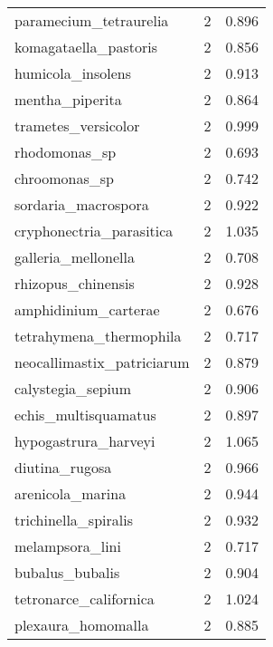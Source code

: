 \begin{tabular}{lrr}
         paramecium\_tetraurelia &                   2 &     0.896 \\
          komagataella\_pastoris &                   2 &     0.856 \\
              humicola\_insolens &                   2 &     0.913 \\
                mentha\_piperita &                   2 &     0.864 \\
            trametes\_versicolor &                   2 &     0.999 \\
                  rhodomonas\_sp &                   2 &     0.693 \\
                  chroomonas\_sp &                   2 &     0.742 \\
            sordaria\_macrospora &                   2 &     0.922 \\
       cryphonectria\_parasitica &                   2 &     1.035 \\
            galleria\_mellonella &                   2 &     0.708 \\
             rhizopus\_chinensis &                   2 &     0.928 \\
           amphidinium\_carterae &                   2 &     0.676 \\
        tetrahymena\_thermophila &                   2 &     0.717 \\
     neocallimastix\_patriciarum &                   2 &     0.879 \\
              calystegia\_sepium &                   2 &     0.906 \\
           echis\_multisquamatus &                   2 &     0.897 \\
           hypogastrura\_harveyi &                   2 &     1.065 \\
                 diutina\_rugosa &                   2 &     0.966 \\
               arenicola\_marina &                   2 &     0.944 \\
           trichinella\_spiralis &                   2 &     0.932 \\
                melampsora\_lini &                   2 &     0.717 \\
                bubalus\_bubalis &                   2 &     0.904 \\
         tetronarce\_californica &                   2 &     1.024 \\
             plexaura\_homomalla &                   2 &     0.885 \\

\end{tabular}
